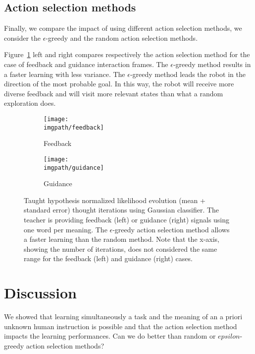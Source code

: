 \subsection{Action selection methods}

Finally, we compare the impact of using different action selection methods, we consider the $\epsilon$-greedy and the random action selection methods.

Figure~\ref{fig:selectionMethod} left and right compares respectively the action selection method for the case of feedback and guidance interaction frames. The $\epsilon$-greedy method results in a faster learning with less variance. The $\epsilon$-greedy method leads the robot in the direction of the most probable goal. In this way, the robot will receive more diverse feedback and will visit more relevant states than what a random exploration does.

\begin{figure}[!htbp]
  \centering
  \begin{subfigure}[b]{0.49\columnwidth}
    \centering
    \texttt{[image: \\imgpath/feedback]}
    \caption{Feedback}
  \end{subfigure}
  \begin{subfigure}[b]{0.49\columnwidth}
    \centering
    \texttt{[image: \\imgpath/guidance]}
    \caption{Guidance}
  \end{subfigure}
  \caption{Taught hypothesis normalized likelihood evolution (mean + standard error) thought iterations using Gaussian classifier. The teacher is providing feedback (left) or guidance (right) signals using one word per meaning. The $\epsilon$-greedy action selection method allows a faster learning than the random method. Note that the x-axis, showing the number of iterations, does not considered the same range for the feedback (left) and guidance (right) cases.}
  \label{fig:selectionMethod}
\end{figure}

\section{Discussion}

We showed that learning simultaneously a task and the meaning of an a priori unknown human instruction is possible and that the action selection method impacts the learning performances. Can we do better than random or $epsilon$-greedy action selection methods?


